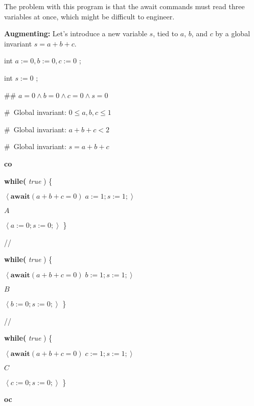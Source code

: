 \documentclass[11pt]{article}%
\begin{document}
The problem with this program is that the await commands must read three
variables at once, which might be difficult to engineer.

\textbf{Augmenting:} Let's introduce a new variable $s$, tied to $a$, $b$, and
$c$ by a global invariant $s=a+b+c$.

\begin{code}
int $a:=0,b:=0,c:=0$ ;

int $s:=0$ ;

\#\# $a=0\wedge b=0\wedge c=0\wedge s=0$

\#\ Global invariant: $0\leq a,b,c\leq1$

\#\ Global invariant: $a+b+c<2$

\#\ Global invariant: $s=a+b+c$

\textbf{co}

\begin{indent}
\item \textbf{while(} \textit{true} ) \{

\begin{indent}
\item $\left\langle \mathbf{await}(a+b+c=0)\;a:=1;s:=1;\right\rangle $

\item $A$

\item $\left\langle a:=0;s:=0;\right\rangle $ \}
\end{indent}
\end{indent}

//

\begin{indent}
\item \textbf{while(} \textit{true} ) \{

\begin{indent}
\item $\left\langle \mathbf{await}(a+b+c=0)\;b:=1;s:=1;\right\rangle $

\item $B$

\item $\left\langle b:=0;s:=0;\right\rangle $ \}
\end{indent}
\end{indent}

//

\begin{indent}
\item \textbf{while(} \textit{true} ) \{

\begin{indent}
\item $\left\langle \mathbf{await}(a+b+c=0)\;c:=1;s:=1;\right\rangle $

\item $C$

\item $\left\langle c:=0;s:=0;\right\rangle $ \}
\end{indent}
\end{indent}

\textbf{oc}
\end{code}
\end{document}

